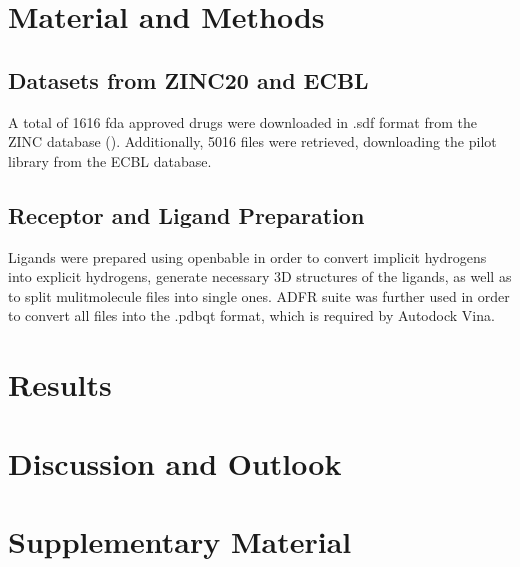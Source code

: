 \documentclass[11pt, letterpaper, titlepage]{article}
\renewcommand{\cite}{\parencite}
\begin{document}
\section{Material and Methods}
\subsection{Datasets from ZINC20 and ECBL}
A total of 1616 fda approved drugs were downloaded in .sdf format from the ZINC database (\cite{Irwin.2020}). Additionally, 5016 files were retrieved, downloading the pilot library from the ECBL database.

\subsection{Receptor and Ligand Preparation}
Ligands were prepared using openbable in order to convert implicit hydrogens into explicit hydrogens, generate necessary 3D structures of the ligands, as well as to split mulitmolecule files into single ones. ADFR suite was further used in order to convert all files into the .pdbqt format, which is required by Autodock Vina. 
 
\section{Results}

\FloatBarrier

\section{Discussion and Outlook}

\section{Supplementary Material}

\pagebreak
\FloatBarrier
\renewcommand{\bibname}{References}  %
\printbibliography
\end{document}
